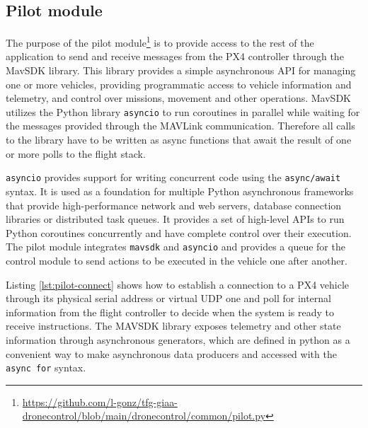 \subsection{Pilot module}
\label{subsec:pilot-module}
The purpose of the pilot module\footnote{\url{https://github.com/l-gonz/tfg-giaa-dronecontrol/blob/main/dronecontrol/common/pilot.py}} is to provide access to the rest of the application to send and receive messages from the PX4 controller through the MavSDK library.
This library provides a simple asynchronous API for managing one or more vehicles, providing programmatic access to vehicle information and telemetry, and control over missions, movement and other operations.
MavSDK utilizes the Python library \texttt{asyncio} to run coroutines in parallel while waiting for the messages provided through the MAVLink communication.
Therefore all calls to the library have to be written as async functions that await the result of one or more polls to the flight stack.

\texttt{asyncio} provides support for writing concurrent code using the \texttt{async/await} syntax.
It is used as a foundation for multiple Python asynchronous frameworks that provide high-performance network and web servers, database connection libraries or distributed task queues.
It provides a set of high-level APIs to run Python coroutines concurrently and have complete control over their execution.
The pilot module integrates \texttt{mavsdk} and \texttt{asyncio} and provides a queue for the control module to send actions to be executed in the vehicle one after another.

Listing \ref{lst:pilot-connect} shows how to establish a connection to a PX4 vehicle through its physical serial address or virtual UDP one and poll for internal information from the flight controller to decide when the system is ready to receive instructions.
The MAVSDK library exposes telemetry and other state information through asynchronous generators, which are defined in python as a convenient way to make asynchronous data producers and accessed with the \texttt{async\ for} syntax.


